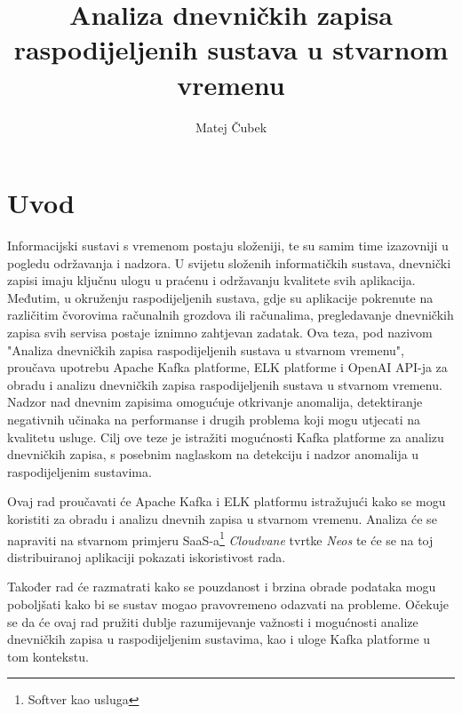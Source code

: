 \documentclass[times, utf8, diplomski]{fer}
\begin{document}

\title{Analiza dnevničkih zapisa raspodijeljenih sustava u stvarnom vremenu}

\author{Matej Čubek}

\maketitle

\zahvala{}

\tableofcontents

\chapter{Uvod}

Informacijski sustavi s vremenom postaju složeniji, te su samim time izazovniji u pogledu održavanja i nadzora. U svijetu složenih informatičkih sustava, dnevnički zapisi imaju ključnu ulogu u praćenu i održavanju kvalitete svih aplikacija. Međutim, u okruženju raspodijeljenih sustava, gdje su aplikacije pokrenute na različitim čvorovima računalnih grozdova ili računalima, pregledavanje dnevničkih zapisa svih servisa postaje iznimno zahtjevan zadatak. Ova teza, pod nazivom "Analiza dnevničkih zapisa raspodijeljenih sustava u stvarnom vremenu", proučava upotrebu Apache Kafka platforme, ELK platforme i OpenAI API-ja za obradu i analizu dnevničkih zapisa raspodijeljenih sustava u stvarnom vremenu.\\

Nadzor nad dnevnim zapisima omogućuje otkrivanje anomalija, detektiranje negativnih učinaka na performanse i drugih problema koji mogu utjecati na kvalitetu usluge. Cilj ove teze je istražiti mogućnosti Kafka platforme za analizu dnevničkih zapisa, s posebnim naglaskom na detekciju i nadzor anomalija u raspodijeljenim sustavima.

Ovaj rad proučavati će Apache Kafka  i ELK platformu istražujući kako se mogu koristiti za obradu i analizu dnevnih zapisa u stvarnom vremenu. Analiza će se napraviti na stvarnom primjeru SaaS-a\footnote{Softver kao usluga } \emph{Cloudvane} tvrtke \emph{Neos} te će se na toj distribuiranoj aplikaciji pokazati iskoristivost rada.

Također rad će razmatrati kako se pouzdanost i brzina obrade podataka mogu poboljšati kako bi se sustav mogao pravovremeno odazvati na probleme. Očekuje se da će ovaj rad pružiti dublje razumijevanje važnosti i mogućnosti analize dnevničkih zapisa u raspodijeljenim sustavima, kao i uloge Kafka platforme u tom kontekstu.
\end{document}

